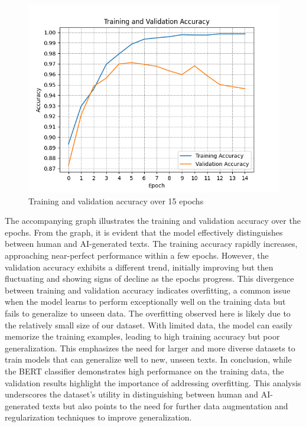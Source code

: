 \documentclass[11pt]{article}
\begin{document}
\begin{figure}[H]
  \centering
  \includegraphics[width=\linewidth]{accuracy.png}
  \caption{Training and validation accuracy over 15 epochs}
  \label{fig:example}
\end{figure}

The accompanying graph illustrates the training and validation accuracy over the epochs.
From the graph, it is evident that the model effectively distinguishes between human and AI-generated texts. The training accuracy rapidly increases, approaching near-perfect performance within a few epochs. However, the validation accuracy exhibits a different trend, initially improving but then fluctuating and showing signs of decline as the epochs progress. This divergence between training and validation accuracy indicates overfitting, a common issue when the model learns to perform exceptionally well on the training data but fails to generalize to unseen data.
The overfitting observed here is likely due to the relatively small size of our dataset. With limited data, the model can easily memorize the training examples, leading to high training accuracy but poor generalization. This emphasizes the need for larger and more diverse datasets to train models that can generalize well to new, unseen texts.
In conclusion, while the BERT classifier demonstrates high performance on the training data, the validation results highlight the importance of addressing overfitting. This analysis underscores the dataset's utility in distinguishing between human and AI-generated texts but also points to the need for further data augmentation and regularization techniques to improve generalization.
\end{document}
